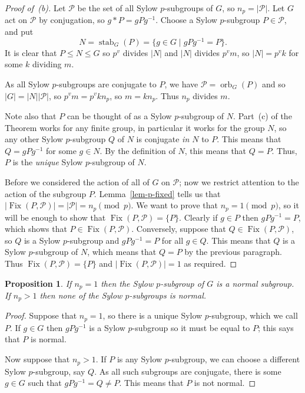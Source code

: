 \documentclass{amsart}
\DeclareMathOperator{\Fix}      {Fix}
\DeclareMathOperator{\orb}      {orb}
\DeclareMathOperator{\stab}     {stab}
\newcommand{\st}        {\;|\;}
\newcommand{\CP}        {{\mathcal{P}}}
\renewcommand{\:}{\colon}
\newtheorem{proposition}[theorem]{Proposition}
\theoremstyle{definition}
\begin{document}
\begin{proof}[Proof of~(b)]
 Let $\CP$ be the set of all Sylow $p$-subgroups of $G$, so
 $n_p=|\CP|$.  Let $G$ act on $\CP$ by conjugation, so $g*P=gPg^{-1}$.
 Choose a Sylow $p$-subgroup $P\in\CP$, and put
 \[ N=\stab_G(P)=\{g\in G \st gPg^{-1}=P\}. \]
 It is clear that $P\leq N\leq G$ so $p^v$ divides $|N|$ and $|N|$
 divides $p^vm$, so $|N|=p^vk$ for some $k$ dividing $m$.

 As all Sylow $p$-subgroups are conjugate to $P$, we have
 $\CP=\orb_G(P)$ and so $|G|=|N||\CP|$, so $p^vm=p^vkn_p$, so
 $m=kn_p$.  Thus $n_p$ divides $m$.

 Note also that $P$ can be thought of as a Sylow $p$-subgroup of $N$.
 Part~(c) of the Theorem works for any finite group, in particular it
 works for the group $N$, so any other Sylow $p$-subgroup $Q$ of $N$
 is conjugate \emph{in $N$} to $P$.  This means that $Q=gPg^{-1}$ for
 some $g\in N$.  By the definition of $N$, this means that $Q=P$.
 Thus, $P$ is the \emph{unique} Sylow $p$-subgroup of $N$.

 Before we considered the action of all of $G$ on $\CP$; now we
 restrict attention to the action of the subgroup $P$.
 Lemma~\ref{lem-p-fixed} tells us that
 $|\Fix(P,\CP)|=|\CP|=n_p\pmod{p}$.  We want to prove that
 $n_p=1\pmod{p}$, so it will be enough to show that
 $\Fix(P,\CP)=\{P\}$.  Clearly if $g\in P$ then $gPg^{-1}=P$, which
 shows that $P\in\Fix(P,\CP)$.  Conversely, suppose that
 $Q\in\Fix(P,\CP)$, so $Q$ is a Sylow $p$-subgroup and $gPg^{-1}=P$
 for all $g\in Q$.  This means that $Q$ is a Sylow $p$-subgroup of
 $N$, which means that $Q=P$ by the previous paragraph.  Thus
 $\Fix(P,\CP)=\{P\}$ and $|\Fix(P,\CP)|=1$ as required.
\end{proof}

\begin{proposition}\label{prop-sylow-normal}
 If $n_p=1$ then the Sylow $p$-subgroup of $G$ is a normal subgroup.
 If $n_p>1$ then none of the Sylow $p$-subgroups is normal.
\end{proposition}
\begin{proof}
 Suppose that $n_p=1$, so there is a unique Sylow $p$-subgroup, which
 we call $P$.  If $g\in G$ then $gPg^{-1}$ is a Sylow $p$-subgroup so
 it must be equal to $P$; this says that $P$ is normal.

 Now suppose that $n_p>1$.  If $P$ is any Sylow $p$-subgroup, we can
 choose a different Sylow $p$-subgroup, say $Q$.  As all such
 subgroups are conjugate, there is some $g\in G$ such that
 $gPg^{-1}=Q\neq P$.  This means that $P$ is not normal.
\end{proof}
\end{document}
